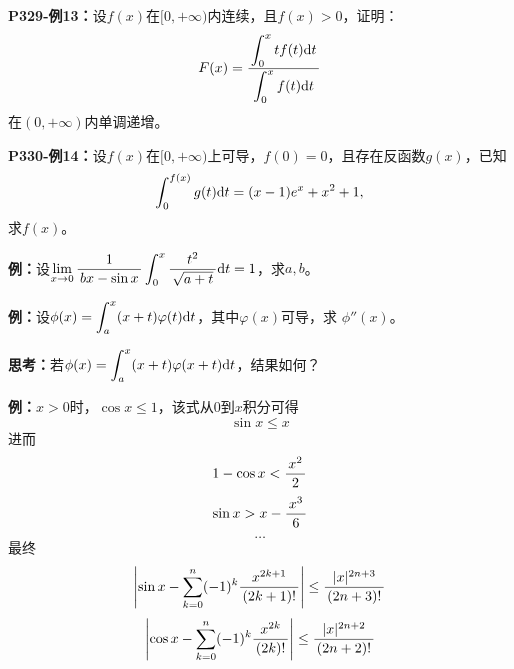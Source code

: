 {\bf P329-例13：}设$f(x)$在$[0,+\infty)$内连续，且$f(x)>0$，证明：
$$F(x)=\displaystyle\frac{\,{\displaystyle\int_0^xtf(t)\mathrm{d} t}\,}{\,{\displaystyle\int_0^xf(t)\mathrm{d} t}\,}$$
在$(0,+\infty)$内单调递增。

{\bf P330-例14：}设$f(x)$在$[0,+\infty)$上可导，$f(0)=0$，且存在反函数$g(x)$，已知
$$\displaystyle\int_0^{f(x)}g(t)\mathrm{d} t=(x-1)e^x+x^2+1,$$
求$f(x)$。

{\bf 例：}设$\lim\limits_{x\to{0}}\displaystyle\frac{\,{1}\,}{\,{bx-\sin
x}\,}\displaystyle\int_0^x\displaystyle\frac{\,{t^2}\,}{\,{\sqrt{a+t}}\,}\mathrm{d} t=1$，求$a,b$。

{\bf 例：}设$\phi(x)=\displaystyle\int_a^x(x+t)\varphi(t)\mathrm{d} t$，其中$\varphi(x)$可导，求
$\phi''(x)$。

{\bf 思考：}若$\phi(x)=\displaystyle\int_a^x(x+t)\varphi(x+t)\mathrm{d} t$，结果如何？

{\bf 例：}$x>0$时，$\cos x\leq 1$，该式从$0$到$x$积分可得
$$\sin x\leq x$$
进而
$$1-\cos x<\displaystyle\frac{\,{x^2}\,}{\,{2}\,}$$
$$\sin x>x-\displaystyle\frac{\,{x^3}\,}{\,{6}\,}$$
$$\ldots$$
最终
$$\left|\sin x-\sum\limits_{k=0}^n(-1)^k\displaystyle\frac{\,{x^{2k+1}}\,}{\,{(2k+1)!}\,}\right|
\leq\displaystyle\frac{\,{|x|^{2n+3}}\,}{\,{(2n+3)!}\,}$$
$$\left|\cos x-\sum\limits_{k=0}^n(-1)^k\displaystyle\frac{\,{x^{2k}}\,}{\,{(2k)!}\,}\right|
\leq\displaystyle\frac{\,{|x|^{2n+2}}\,}{\,{(2n+2)!}\,}$$

